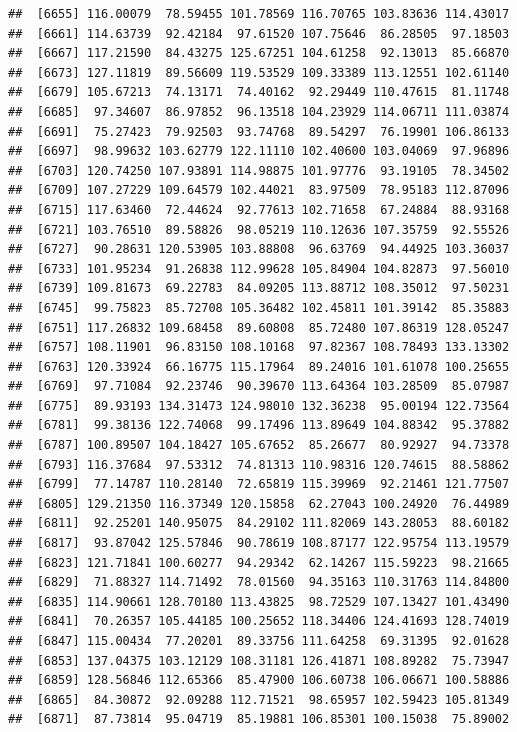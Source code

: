\documentclass[
]{article}
\begin{document}
\begin{verbatim}
##  [6655] 116.00079  78.59455 101.78569 116.70765 103.83636 114.43017
##  [6661] 114.63739  92.42184  97.61520 107.75646  86.28505  97.18503
##  [6667] 117.21590  84.43275 125.67251 104.61258  92.13013  85.66870
##  [6673] 127.11819  89.56609 119.53529 109.33389 113.12551 102.61140
##  [6679] 105.67213  74.13171  74.40162  92.29449 110.47615  81.11748
##  [6685]  97.34607  86.97852  96.13518 104.23929 114.06711 111.03874
##  [6691]  75.27423  79.92503  93.74768  89.54297  76.19901 106.86133
##  [6697]  98.99632 103.62779 122.11110 102.40600 103.04069  97.96896
##  [6703] 120.74250 107.93891 114.98875 101.97776  93.19105  78.34502
##  [6709] 107.27229 109.64579 102.44021  83.97509  78.95183 112.87096
##  [6715] 117.63460  72.44624  92.77613 102.71658  67.24884  88.93168
##  [6721] 103.76510  89.58826  98.05219 110.12636 107.35759  92.55526
##  [6727]  90.28631 120.53905 103.88808  96.63769  94.44925 103.36037
##  [6733] 101.95234  91.26838 112.99628 105.84904 104.82873  97.56010
##  [6739] 109.81673  69.22783  84.09205 113.88712 108.35012  97.50231
##  [6745]  99.75823  85.72708 105.36482 102.45811 101.39142  85.35883
##  [6751] 117.26832 109.68458  89.60808  85.72480 107.86319 128.05247
##  [6757] 108.11901  96.83150 108.10168  97.82367 108.78493 133.13302
##  [6763] 120.33924  66.16775 115.17964  89.24016 101.61078 100.25655
##  [6769]  97.71084  92.23746  90.39670 113.64364 103.28509  85.07987
##  [6775]  89.93193 134.31473 124.98010 132.36238  95.00194 122.73564
##  [6781]  99.38136 122.74068  99.17496 113.89649 104.88342  95.37882
##  [6787] 100.89507 104.18427 105.67652  85.26677  80.92927  94.73378
##  [6793] 116.37684  97.53312  74.81313 110.98316 120.74615  88.58862
##  [6799]  77.14787 110.28140  72.65819 115.39969  92.21461 121.77507
##  [6805] 129.21350 116.37349 120.15858  62.27043 100.24920  76.44989
##  [6811]  92.25201 140.95075  84.29102 111.82069 143.28053  88.60182
##  [6817]  93.87042 125.57846  90.78619 108.87177 122.95754 113.19579
##  [6823] 121.71841 100.60277  94.29342  62.14267 115.59223  98.21665
##  [6829]  71.88327 114.71492  78.01560  94.35163 110.31763 114.84800
##  [6835] 114.90661 128.70180 113.43825  98.72529 107.13427 101.43490
##  [6841]  70.26357 105.44185 100.25652 118.34406 124.41693 128.74019
##  [6847] 115.00434  77.20201  89.33756 111.64258  69.31395  92.01628
##  [6853] 137.04375 103.12129 108.31181 126.41871 108.89282  75.73947
##  [6859] 128.56846 112.65366  85.47900 106.60738 106.06671 100.58886
##  [6865]  84.30872  92.09288 112.71521  98.65957 102.59423 105.81349
##  [6871]  87.73814  95.04719  85.19881 106.85301 100.15038  75.89002

\end{verbatim}
\end{document}

